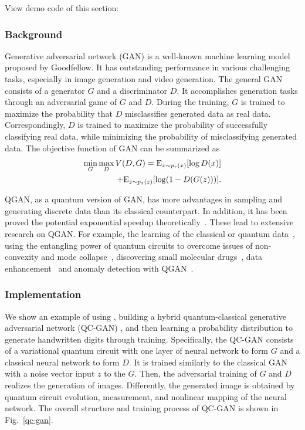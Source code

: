 View demo code of this section: \href{https://gitee.com/mindspore/mindquantum/blob/research/paper_with_code/variational_quantum_circuits_enhanced_generative_adversarial_network/QGAN.py}{\color{ceruleanblue}{Gitee}}

\subsubsection{Background}
Generative adversarial network (GAN) is a well-known machine learning model proposed by Goodfellow. It has outstanding performance in various challenging tasks, especially in image generation and video generation. The general GAN consists of a generator ${G}$ and a discriminator ${D}$. It accomplishes generation tasks through an adversarial game of ${G}$ and ${D}$. During the training, ${G}$ is trained to maximize the probability that ${D}$ misclassifies generated data as real data. Correspondingly, ${D}$ is trained to maximize the probability of successfully classifying real data, while minimizing the probability of misclassifying generated data. The objective function of GAN can be summarized as
\begin{equation}
  \begin{split}
    \mathop {\min }\limits_G \mathop {\max }\limits_D V(D,G) = {\rm{ }}{{\rm{E}}_{x\sim{p_r}(x)}}[\log D(x)]
    \\+ {{\rm{E}}_{z\sim{p_z}(z)}}[\log (1 - D(G(z)))]. \label{eq1}
  \end{split}
\end{equation}

QGAN, as a quantum version of GAN, has more advantages in sampling and generating discrete data than its classical counterpart. In addition, it has been proved the potential exponential speedup theoretically~\cite{lloyd2018quantum}. These lead to extensive research on QGAN. For example, the learning of the classical or quantum data~\cite{benedetti2019adversarial, zeng2019learning, zoufal2019quantum,ahmed2021quantum}, using the entangling power of quantum circuits to overcome issues of non-convexity and mode collapse~\cite{niu2022entangling}, discovering small molecular drugs~\cite{li2021quantum}, data enhancement~\cite{nakaji2021quantum} and anomaly detection with QGAN~\cite{herr2021anomaly}.

\subsubsection{Implementation}
We show an example of using \MindQuantum, building a hybrid quantum-classical generative adversarial network (QC-GAN) \cite{shu2024variational}, and then learning a probability distribution to generate handwritten digits through training. Specifically, the QC-GAN consists of a variational quantum circuit with one layer of neural network to form ${G}$ and a classical neural network to form ${D}$. It is trained similarly to the classical GAN with a noise vector input ${z}$ to the ${G}$. Then, the adversarial training of ${G}$ and ${D}$ realizes the generation of images.
Differently, the generated image is obtained by quantum circuit evolution, measurement, and nonlinear mapping of the neural network. The overall structure and training process of QC-GAN is shown in Fig.~\ref{qc-gan}.

